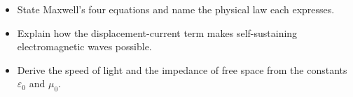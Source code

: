 \begin{objectives}
\begin{itemize}[leftmargin=1.4em,itemsep=2pt]
\item State Maxwell's four equations and name the physical law each expresses.
\item Explain how the displacement-current term makes self-sustaining electromagnetic waves possible.
\item Derive the speed of light and the impedance of free space from the constants $\varepsilon_0$ and $\mu_0$.
\end{itemize}
\end{objectives}
